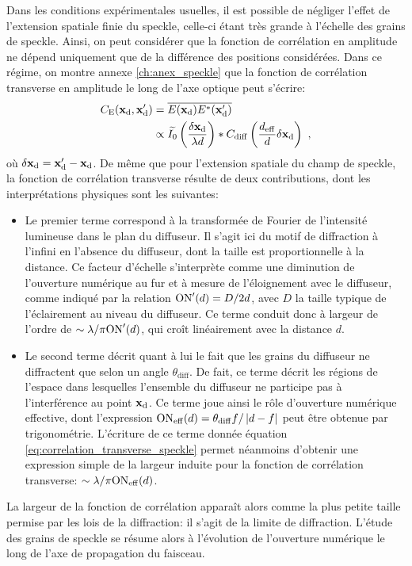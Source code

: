 Dans les conditions expérimentales usuelles, il est possible de négliger l'effet de l'extension spatiale finie du speckle, celle-ci étant très grande à l'échelle des grains de speckle. Ainsi, on peut considérer que la fonction de corrélation en amplitude ne dépend uniquement que de la différence des positions considérées. Dans ce régime, on montre annexe \ref{ch:anex_speckle} que la fonction de corrélation transverse en amplitude le long de l'axe optique peut s'écrire:
\begin{align}
\nonumber C_{\mathrm{E}}(\mathbf{x}_{\mathrm{d}},\mathbf{x}_{\mathrm{d}}') &= \overline{E(\mathbf{x}_{\mathrm{d}}) E^*(\mathbf{x}_{\mathrm{d}}')} \\
& \propto \widetilde{I_0}\left( \frac{\delta\mathbf{x}_{\mathrm{d}}}{\lambda d}\right) \ast C_{\mathrm{diff}}\left( \frac{d_{\mathrm{eff}}}{d} \delta \mathbf{x}_{\mathrm{d}} \right) \text{ ,}
\label{eq:correlation_transverse_speckle}
\end{align}
où $\delta\mathbf{x}_{\mathrm{d}}=\mathbf{x}_{\mathrm{d}}'-\mathbf{x}_{\mathrm{d}}$. De même que pour l'extension spatiale du champ de speckle, la fonction de corrélation transverse résulte de deux contributions, dont les interprétations physiques sont les suivantes:
\begin{itemize}
\item[\textendash] Le premier terme correspond à la transformée de Fourier de l'intensité lumineuse dans le plan du diffuseur. Il s'agit ici du motif de diffraction à l'infini en l'absence du diffuseur, dont la taille est proportionnelle à la distance. Ce facteur d'échelle s'interprète comme une diminution de l'ouverture numérique au fur et à mesure de l'éloignement avec le diffuseur, comme indiqué par la relation $\mathrm{ON}'(d)=D/2d$, avec $D$ la taille typique de l'éclairement au niveau du diffuseur. Ce terme conduit donc à largeur de l'ordre de $\sim\lambda / \pi \mathrm{ON}'(d)$, qui croît linéairement avec la distance $d$. 
\item[\textendash] Le second terme décrit quant à lui le fait que les grains du diffuseur ne diffractent que selon un angle $\theta_{\mathrm{diff}}$. De fait, ce terme décrit les régions de l'espace dans lesquelles l'ensemble du diffuseur ne participe pas à l'interférence au point $\mathbf{x}_{\mathrm{d}}$. Ce terme joue ainsi le rôle d'ouverture numérique effective, dont l'expression $\mathrm{ON}_{\mathrm{eff}}(d)=\theta_{\mathrm{diff}} f/\left| d-f \right|$ peut être obtenue par trigonométrie. L'écriture de ce terme donnée équation \ref{eq:correlation_transverse_speckle} permet néanmoins d'obtenir une expression simple de la largeur induite pour la fonction de corrélation transverse: $\sim\lambda /\pi \mathrm{ON}_{\mathrm{eff}} (d)$.
\end{itemize}
La largeur de la fonction de corrélation apparaît alors comme la plus petite taille permise par les lois de la diffraction: il s'agit de la limite de diffraction. L'étude des grains de speckle se résume alors à l'évolution de l'ouverture numérique le long de l'axe de propagation du faisceau.

